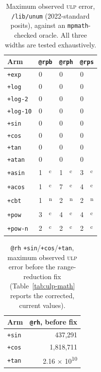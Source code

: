 \documentclass[twoside]{article}
\begin{document}
\begin{table}[h]
\centering
\caption{Maximum observed \textsc{ulp} error, \texttt{/lib/unum} (2022-standard posits), against an \texttt{mpmath}-checked oracle.  All three widths are tested exhaustively.}
\label{tab:ulp-unum}
\begin{tabular}{l r@{}l r@{}l r@{}l}
\toprule
Arm & \multicolumn{2}{c}{\texttt{@rpb}} & \multicolumn{2}{c}{\texttt{@rph}} & \multicolumn{2}{c}{\texttt{@rps}} \\
\midrule
\texttt{+exp}     & 0 & {} & 0 & {} & 0 & {} \\
\texttt{+log}     & 0 & {} & 0 & {} & 0 & {} \\
\texttt{+log-2}   & 0 & {} & 0 & {} & 0 & {} \\
\texttt{+log-10}  & 0 & {} & 0 & {} & 0 & {} \\
\texttt{+sin}     & 0 & {} & 0 & {} & 0 & {} \\
\texttt{+cos}     & 0 & {} & 0 & {} & 0 & {} \\
\texttt{+tan}     & 0 & {} & 0 & {} & 0 & {} \\
\texttt{+atan}    & 0 & {} & 0 & {} & 0 & {} \\
\texttt{+asin}    & 1 & \textsuperscript{c} & 1 & \textsuperscript{c} & 3 & \textsuperscript{c} \\
\texttt{+acos}    & 1 & \textsuperscript{c} & 7 & \textsuperscript{c} & 4 & \textsuperscript{c} \\
\texttt{+cbt}     & 1 & \textsuperscript{n} & 2 & \textsuperscript{n} & 2 & \textsuperscript{n} \\
\texttt{+pow}     & 3 & \textsuperscript{c} & 4 & \textsuperscript{c} & 4 & \textsuperscript{c} \\
\texttt{+pow-n}   & 2 & \textsuperscript{c} & 2 & \textsuperscript{c} & 2 & \textsuperscript{c} \\
\bottomrule
\end{tabular}
\end{table}

\begin{table}[h]
\centering
\caption{\texttt{@rh} \texttt{+sin}/\texttt{+cos}/\texttt{+tan}, maximum observed \textsc{ulp} error before the range-reduction fix (Table~\ref{tab:ulp-math} reports the corrected, current values).}
\label{tab:ulp-before}
\begin{tabular}{lr}
\toprule
Arm & \texttt{@rh}, before fix \\
\midrule
\texttt{+sin} & 437,291 \\
\texttt{+cos} & 1,818,711 \\
\texttt{+tan} & 2.16 × 10\textsuperscript{10} \\
\bottomrule
\end{tabular}
\end{table}
\end{document}
